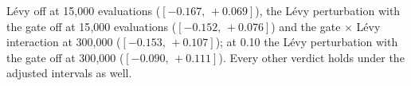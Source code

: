 \begin{table}[htbp]
\begin{flushleft}
L\'evy off at 15{,}000 evaluations ($[-0.167,\,+0.069]$), the L\'evy perturbation with the gate off at 15{,}000 evaluations ($[-0.152,\,+0.076]$) and the gate $\times$ L\'evy interaction at 300{,}000 ($[-0.153,\,+0.107]$); at 0.10 the L\'evy perturbation with the gate off at 300{,}000 ($[-0.090,\,+0.111]$). Every other verdict holds under the adjusted intervals as well.
\end{flushleft}
\end{table}
